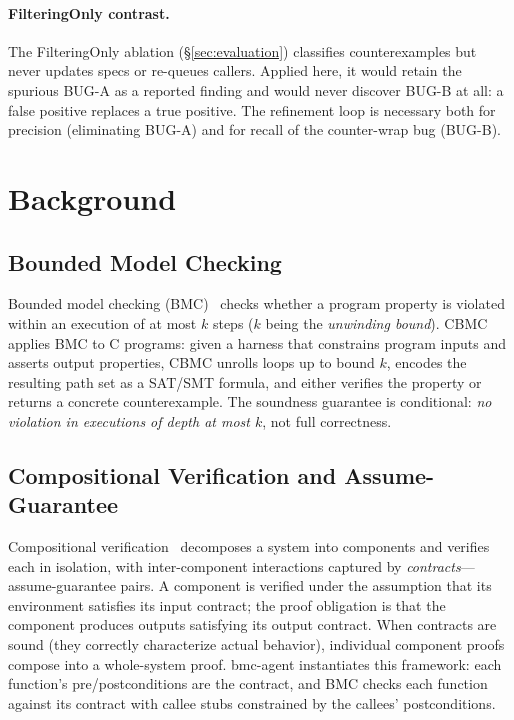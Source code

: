 \documentclass[11pt,a4paper]{article}
\newcommand{\tool}{bmc-agent\xspace}
\begin{document}
\paragraph{FilteringOnly contrast.}
The FilteringOnly ablation (\S\ref{sec:evaluation}) classifies counterexamples
but never updates specs or re-queues callers.  Applied here, it would
retain the spurious BUG-A as a reported finding and would never discover
BUG-B at all: a false positive replaces a true positive.  The refinement loop
is necessary both for precision (eliminating BUG-A) and for recall of the
counter-wrap bug (BUG-B).

\section{Background}
\label{sec:background}

\subsection{Bounded Model Checking}

Bounded model checking (BMC)~\cite{bmc-survey} checks whether a program
property is violated within an execution of at most $k$ steps ($k$ being the
\emph{unwinding bound}). CBMC~\cite{cbmc} applies BMC to C programs: given a
harness that constrains program inputs and asserts output properties, CBMC
unrolls loops up to bound $k$, encodes the resulting path set as a SAT/SMT
formula, and either verifies the property or returns a concrete
counterexample. The soundness guarantee is conditional: \emph{no violation in
executions of depth at most $k$}, not full correctness.

\subsection{Compositional Verification and Assume-Guarantee}

Compositional verification~\cite{assume-guarantee} decomposes a system into
components and verifies each in isolation, with inter-component interactions
captured by \emph{contracts}---assume-guarantee pairs. A component is
verified under the assumption that its environment satisfies its input
contract; the proof obligation is that the component produces outputs
satisfying its output contract. When contracts are sound (they correctly
characterize actual behavior), individual component proofs compose into a
whole-system proof. \tool instantiates this framework: each function's
pre/postconditions are the contract, and BMC checks each function against its
contract with callee stubs constrained by the callees' postconditions.
\end{document}
